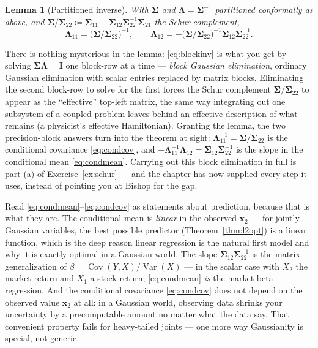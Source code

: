 \documentclass[11pt]{article}
\numberwithin{equation}{section}
\theoremstyle{plain}
\newtheorem{lemma}[theorem]{Lemma}
\theoremstyle{definition}
\theoremstyle{remark}
\DeclareMathOperator{\Var}{Var}
\DeclareMathOperator{\Cov}{Cov}
\newcommand{\x}{\bm{x}}
\newcommand{\bSigma}{\bm{\Sigma}}
\begin{document}
\begin{lemma}[Partitioned inverse]\label{lem:blockinv}
With $\bSigma$ and $\bm{\Lambda} = \bSigma^{-1}$ partitioned conformally as above, and $\bSigma/\bSigma_{22} \coloneqq \bSigma_{11} - \bSigma_{12}\bSigma_{22}^{-1}\bSigma_{21}$ the Schur complement,
\begin{equation}
\bm{\Lambda}_{11} = \big(\bSigma/\bSigma_{22}\big)^{-1},
\qquad
\bm{\Lambda}_{12} = -\big(\bSigma/\bSigma_{22}\big)^{-1} \bSigma_{12}\bSigma_{22}^{-1} .
\label{eq:blockinv}
\end{equation}
\end{lemma}

There is nothing mysterious in the lemma: \eqref{eq:blockinv} is what you get by solving $\bSigma\bm{\Lambda} = \bm{I}$ one block-row at a time --- \emph{block Gaussian elimination}, ordinary Gaussian elimination with scalar entries replaced by matrix blocks. Eliminating the second block-row to solve for the first forces the Schur complement $\bSigma/\bSigma_{22}$ to appear as the ``effective'' top-left matrix, the same way integrating out one subsystem of a coupled problem leaves behind an effective description of what remains (a physicist's effective Hamiltonian). Granting the lemma, the two precision-block answers turn into the theorem at sight: $\bm{\Lambda}_{11}^{-1} = \bSigma/\bSigma_{22}$ is the conditional covariance \eqref{eq:condcov}, and $-\bm{\Lambda}_{11}^{-1}\bm{\Lambda}_{12} = \bSigma_{12}\bSigma_{22}^{-1}$ is the slope in the conditional mean \eqref{eq:condmean}. Carrying out this block elimination in full is part (a) of Exercise~\ref{ex:schur} --- and the chapter has now supplied every step it uses, instead of pointing you at Bishop for the gap.

Read \eqref{eq:condmean}--\eqref{eq:condcov} as statements about prediction, because that is what they are. The conditional mean is \emph{linear} in the observed $\x_2$ --- for jointly Gaussian variables, the best possible predictor (Theorem~\ref{thm:l2opt}) is a linear function, which is the deep reason linear regression is the natural first model and why it is exactly optimal in a Gaussian world. The slope $\bSigma_{12}\bSigma_{22}^{-1}$ is the matrix generalization of $\beta = \Cov(Y,X)/\Var(X)$ --- in the scalar case with $X_2$ the market return and $X_1$ a stock return, \eqref{eq:condmean} \emph{is} the market beta regression. And the conditional covariance \eqref{eq:condcov} does not depend on the observed value $\x_2$ at all: in a Gaussian world, observing data shrinks your uncertainty by a precomputable amount no matter what the data say. That convenient property fails for heavy-tailed joints --- one more way Gaussianity is special, not generic.
\end{document}
